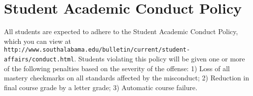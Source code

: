 \documentclass{article}
\begin{document}
\section*{\fontsize{12}{15}\selectfont Student Academic Conduct Policy}
All students are expected to adhere to the Student Academic Conduct Policy, which you can view at
{\tt http://www.southalabama.edu/bulletin/current/student-affairs/conduct.html}.  Students violating this policy will be given one or more of the following penalties based on the severity of the offense:  1) Loss of all mastery checkmarks on all standards affected by the misconduct; 2) Reduction in final course grade by a letter grade; 3) Automatic course failure.
\end{document}
